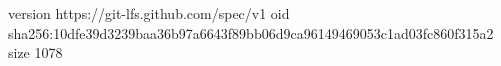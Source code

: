 version https://git-lfs.github.com/spec/v1
oid sha256:10dfe39d3239baa36b97a6643f89bb06d9ca96149469053c1ad03fc860f315a2
size 1078
